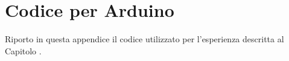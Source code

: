 \chapter{Codice per Arduino}\label{app:ard}
    Riporto in questa appendice il codice utilizzato per l'esperienza descritta al Capitolo .
    
